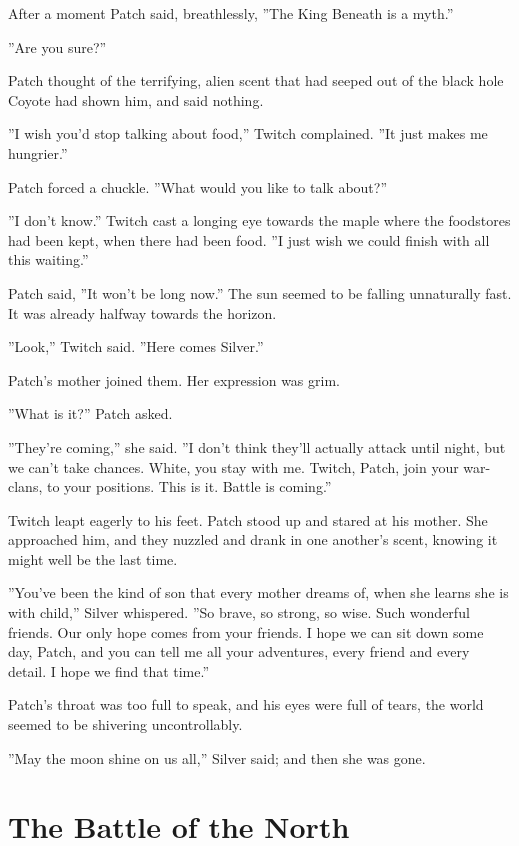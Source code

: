 \documentclass[12pt]{book}
\begin{document}
After a moment Patch said, breathlessly, ''The King Beneath is a myth.''

''Are you sure?''

Patch thought of the terrifying, alien scent that had seeped out of the black hole Coyote had shown him, and said nothing.

''I wish you'd stop talking about food,'' Twitch complained. ''It just makes me hungrier.''

Patch forced a chuckle. ''What would you like to talk about?''

''I don't know.'' Twitch cast a longing eye towards the maple where the foodstores had been kept, when there had been food. ''I just wish we could finish with all this waiting.''

Patch said, ''It won't be long now.'' The sun seemed to be falling unnaturally fast. It was already halfway towards the horizon.

''Look,'' Twitch said. ''Here comes Silver.''

Patch's mother joined them. Her expression was grim.

''What is it?'' Patch asked.

''They're coming,'' she said. ''I don't think they'll actually attack until night, but we can't take chances. White, you stay with me. Twitch, Patch, join your war-clans, to your positions. This is it. Battle is coming.''

Twitch leapt eagerly to his feet. Patch stood up and stared at his mother. She approached him, and they nuzzled and drank in one another's scent, knowing it might well be the last time.

''You've been the kind of son that every mother dreams of, when she learns she is with child,'' Silver whispered. ''So brave, so strong, so wise. Such wonderful friends. Our only hope comes from your friends. I hope we can sit down some day, Patch, and you can tell me all your adventures, every friend and every detail. I hope we find that time.''

Patch's throat was too full to speak, and his eyes were full of tears, the world seemed to be shivering uncontrollably.

''May the moon shine on us all,'' Silver said; and then she was gone.


\section{The Battle of the North}
\end{document}
